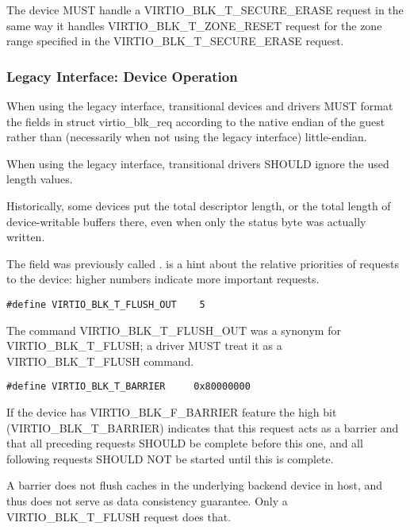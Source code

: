 The device MUST handle a VIRTIO_BLK_T_SECURE_ERASE request in the same way it
handles VIRTIO_BLK_T_ZONE_RESET request for the zone range specified in the
VIRTIO_BLK_T_SECURE_ERASE request.

\subsubsection{Legacy Interface: Device Operation}\label{sec:Device Types / Block Device / Device Operation / Legacy Interface: Device Operation}
When using the legacy interface, transitional devices and drivers
MUST format the fields in struct virtio_blk_req
according to the native endian of the guest rather than
(necessarily when not using the legacy interface) little-endian.

When using the legacy interface, transitional drivers
SHOULD ignore the used length values.
\begin{note}
Historically, some devices put the total descriptor length,
or the total length of device-writable buffers there,
even when only the status byte was actually written.
\end{note}

The  field was previously called .  
is a hint about the relative priorities of requests to the device:
higher numbers indicate more important requests.

\begin{lstlisting}
#define VIRTIO_BLK_T_FLUSH_OUT    5
\end{lstlisting}

The command VIRTIO_BLK_T_FLUSH_OUT was a synonym for VIRTIO_BLK_T_FLUSH;
a driver MUST treat it as a VIRTIO_BLK_T_FLUSH command.

\begin{lstlisting}
#define VIRTIO_BLK_T_BARRIER     0x80000000
\end{lstlisting}

If the device has VIRTIO_BLK_F_BARRIER
feature the high bit (VIRTIO_BLK_T_BARRIER) indicates that this
request acts as a barrier and that all preceding requests SHOULD be
complete before this one, and all following requests SHOULD NOT be
started until this is complete.

\begin{note} A barrier does not flush
caches in the underlying backend device in host, and thus does not
serve as data consistency guarantee.  Only a VIRTIO_BLK_T_FLUSH request
does that.
\end{note}

